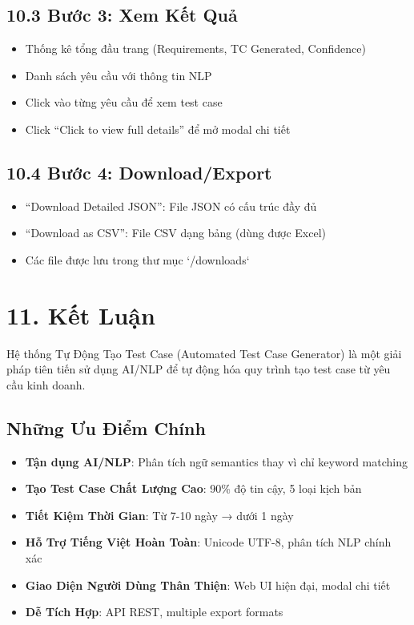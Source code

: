 \documentclass[14pt,a4paper]{article}
\begin{document}
\subsection{10.3 Bước 3: Xem Kết Quả}

\begin{itemize}
    \item Thống kê tổng đầu trang (Requirements, TC Generated, Confidence)
    \item Danh sách yêu cầu với thông tin NLP
    \item Click vào từng yêu cầu để xem test case
    \item Click ``Click to view full details'' để mở modal chi tiết
\end{itemize}

\subsection{10.4 Bước 4: Download/Export}

\begin{itemize}
    \item ``Download Detailed JSON'': File JSON có cấu trúc đầy đủ
    \item ``Download as CSV'': File CSV dạng bảng (dùng được Excel)
    \item Các file được lưu trong thư mục `/downloads`
\end{itemize}

\section{11. Kết Luận}

Hệ thống Tự Động Tạo Test Case (Automated Test Case Generator) 
là một giải pháp tiên tiến sử dụng AI/NLP để tự động hóa quy trình 
tạo test case từ yêu cầu kinh doanh. 

\subsection{Những Ưu Điểm Chính}

\begin{itemize}
    \item \textbf{Tận dụng AI/NLP}: Phân tích ngữ semantics thay vì chỉ keyword matching
    \item \textbf{Tạo Test Case Chất Lượng Cao}: 90\% độ tin cậy, 5 loại kịch bản
    \item \textbf{Tiết Kiệm Thời Gian}: Từ 7-10 ngày → dưới 1 ngày
    \item \textbf{Hỗ Trợ Tiếng Việt Hoàn Toàn}: Unicode UTF-8, phân tích NLP chính xác
    \item \textbf{Giao Diện Người Dùng Thân Thiện}: Web UI hiện đại, modal chi tiết
    \item \textbf{Dễ Tích Hợp}: API REST, multiple export formats
\end{itemize}
\end{document}
